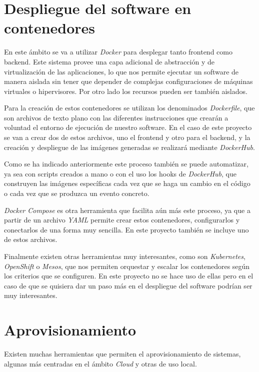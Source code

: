 \section{Despliegue del software en contenedores}

En este ámbito se va a utilizar \textit{Docker} para desplegar tanto frontend como backend. Este sistema provee una capa adicional de abstracción y de virtualización de las aplicaciones, lo que nos permite ejecutar un software de manera aislada sin tener que depender de complejas configuraciones de máquinas virtuales o hipervisores. Por otro lado los recursos pueden ser también aislados.

Para la creación de estos contenedores se utilizan los denominados \textit{Dockerfile}, que son archivos de texto plano con las diferentes instrucciones que crearán a voluntad el entorno de ejecución de nuestro software. En el caso de este proyecto se van a crear dos de estos archivos, uno el frontend y otro para el backend, y la creación y despliegue de las imágenes generadas se realizará mediante \textit{DockerHub}.

Como se ha indicado anteriormente este proceso también se puede automatizar, ya sea con scripts creados a mano o con el uso los hooks de \textit{DockerHub}, que construyen las imágenes específicas cada vez que se haga un cambio en el código o cada vez que se produzca un evento concreto.

\textit{Docker Compose} es otra herramienta que facilita aún más este proceso, ya que a partir de un archivo \textit{YAML} permite crear estos contenedores, configurarlos y conectarlos de una forma muy sencilla. En este proyecto también se incluye uno de estos archivos.

Finalmente existen otras herramientas muy interesantes, como son \textit{Kubernetes}, \textit{OpenShift} o \textit{Mesos}, que nos permiten orquestar y escalar los contenedores según los criterios que se configuren. En este proyecto no se hace uso de ellas pero en el caso de que se quisiera dar un paso más en el despliegue del software podrían ser muy interesantes.


\section{Aprovisionamiento}

Existen muchas herramientas que permiten el aprovisionamiento de sistemas, algunas más centradas en el ámbito \textit{Cloud} y otras de uso local.

